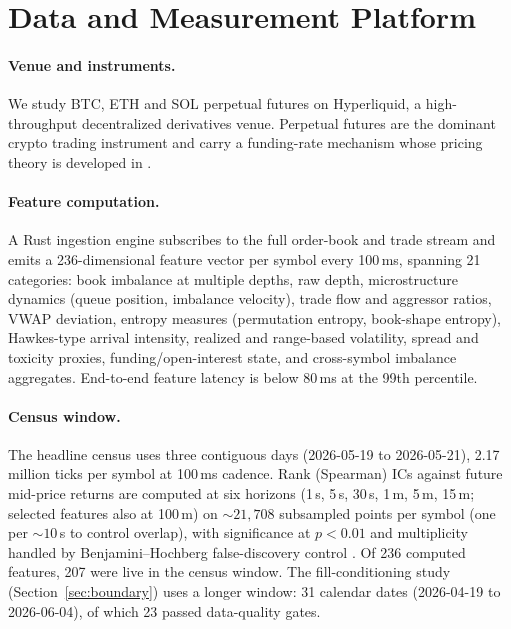 \documentclass[11pt,a4paper]{article}
\theoremstyle{definition}
\theoremstyle{plain}
\begin{document}
\section{Data and Measurement Platform}\label{sec:data}

\paragraph{Venue and instruments.} We study BTC, ETH and SOL perpetual
futures on Hyperliquid, a high-throughput decentralized derivatives
venue. Perpetual futures are the dominant crypto trading instrument
and carry a funding-rate mechanism whose pricing theory is developed
in \citet{ackerer2025}.

\paragraph{Feature computation.} A Rust ingestion engine subscribes to
the full order-book and trade stream and emits a 236-dimensional
feature vector per symbol every 100\,ms, spanning 21 categories: book
imbalance at multiple depths, raw depth, microstructure dynamics
(queue position, imbalance velocity), trade flow and aggressor ratios,
VWAP deviation, entropy measures (permutation entropy, book-shape
entropy), Hawkes-type arrival intensity, realized and range-based
volatility, spread and toxicity proxies, funding/open-interest state,
and cross-symbol imbalance aggregates. End-to-end feature latency is
below 80\,ms at the 99th percentile.

\paragraph{Census window.} The headline census uses three contiguous
days (2026-05-19 to 2026-05-21), 2.17 million ticks per symbol at
100\,ms cadence. Rank (Spearman) ICs against future mid-price returns
are computed at six horizons (1\,s, 5\,s, 30\,s, 1\,m, 5\,m, 15\,m;
selected features also at 100\,m) on ${\sim}21{,}708$ subsampled
points per symbol (one per ${\sim}10$\,s to control overlap), with
significance at $p<0.01$ and multiplicity handled by
Benjamini--Hochberg false-discovery control \citep{benjamini1995}.
Of 236 computed features, 207 were live in the census window.
The fill-conditioning study (Section~\ref{sec:boundary}) uses a longer
window: 31 calendar dates (2026-04-19 to 2026-06-04), of which 23
passed data-quality gates.
\end{document}
